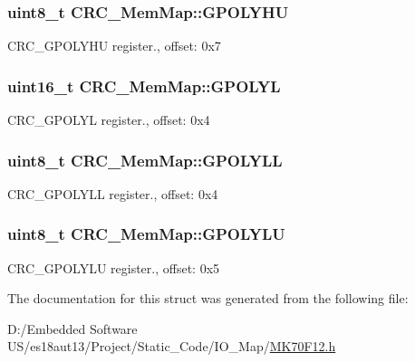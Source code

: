 \subsubsection[{G\+P\+O\+L\+Y\+H\+U}]{\setlength{\rightskip}{0pt plus 5cm}uint8\+\_\+t C\+R\+C\+\_\+\+Mem\+Map\+::\+G\+P\+O\+L\+Y\+H\+U}\label{struct_c_r_c___mem_map_ae7c166006427c82d21b88417313cf511}
C\+R\+C\+\_\+\+G\+P\+O\+L\+Y\+H\+U register., offset\+: 0x7 \hypertarget{struct_c_r_c___mem_map_a4cd3b43b213defbaa07381a32b24af67}{}
\subsubsection[{G\+P\+O\+L\+Y\+L}]{\setlength{\rightskip}{0pt plus 5cm}uint16\+\_\+t C\+R\+C\+\_\+\+Mem\+Map\+::\+G\+P\+O\+L\+Y\+L}\label{struct_c_r_c___mem_map_a4cd3b43b213defbaa07381a32b24af67}
C\+R\+C\+\_\+\+G\+P\+O\+L\+Y\+L register., offset\+: 0x4 \hypertarget{struct_c_r_c___mem_map_afefe4288aecf5a31ca6f6d64317eeb4b}{}
\subsubsection[{G\+P\+O\+L\+Y\+L\+L}]{\setlength{\rightskip}{0pt plus 5cm}uint8\+\_\+t C\+R\+C\+\_\+\+Mem\+Map\+::\+G\+P\+O\+L\+Y\+L\+L}\label{struct_c_r_c___mem_map_afefe4288aecf5a31ca6f6d64317eeb4b}
C\+R\+C\+\_\+\+G\+P\+O\+L\+Y\+L\+L register., offset\+: 0x4 \hypertarget{struct_c_r_c___mem_map_a0ba8bc9ddb8de4ca001f205f32cdd626}{}
\subsubsection[{G\+P\+O\+L\+Y\+L\+U}]{\setlength{\rightskip}{0pt plus 5cm}uint8\+\_\+t C\+R\+C\+\_\+\+Mem\+Map\+::\+G\+P\+O\+L\+Y\+L\+U}\label{struct_c_r_c___mem_map_a0ba8bc9ddb8de4ca001f205f32cdd626}
C\+R\+C\+\_\+\+G\+P\+O\+L\+Y\+L\+U register., offset\+: 0x5 

The documentation for this struct was generated from the following file\+:\begin{DoxyCompactItemize}
\item 
D\+:/\+Embedded Software U\+S/es18aut13/\+Project/\+Static\+\_\+\+Code/\+I\+O\+\_\+\+Map/\hyperlink{_m_k70_f12_8h}{M\+K70\+F12.\+h}\end{DoxyCompactItemize}
